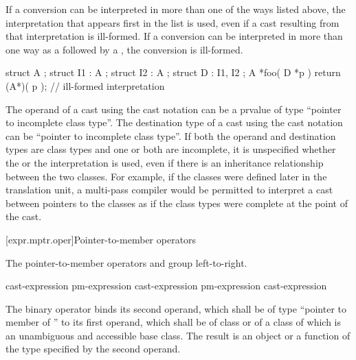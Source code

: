 If a conversion can be interpreted in more than one of the ways listed
above, the interpretation that appears first in the list is used, even
if a cast resulting from that interpretation is ill-formed. If a
conversion can be interpreted in more than one way as a
 followed by a , the conversion is
ill-formed.
\enterexample 

\begin{codeblock}
struct A { };
struct I1 : A { };
struct I2 : A { };
struct D : I1, I2 { };
A *foo( D *p ) {
  return (A*)( p ); // ill-formed  interpretation
}
\end{codeblock}
\exitexample 

\pnum
{}%
The operand of a cast using the cast notation can be a prvalue of type
``pointer to incomplete class type''. The destination type of a cast
using the cast notation can be ``pointer to incomplete class type''. If
both the operand and destination types are class types and one or both
are incomplete, it is unspecified whether the  or the
 interpretation is used, even if there is an
inheritance relationship between the two classes.
\enternote
For example, if the classes were defined later in the translation unit,
a multi-pass compiler would be permitted to interpret a cast between
pointers to the classes as if the class types were complete at the point
of the cast.
\exitnote%

[expr.mptr.oper]{Pointer-to-member operators}

\pnum
{}%
%
%
%
%
%
The pointer-to-member operators \tcode{->*} and  group
left-to-right.

\begin{bnf}
\br
    cast-expression\br
    pm-expression  cast-expression\br
    pm-expression \terminal{->*} cast-expression
\end{bnf}

\pnum
The binary operator  binds its second operand, which shall be
of type ``pointer to member of '' to its first operand, which shall be of
class  or of a class of which  is an unambiguous and
accessible base class. The result is an object or a function of the type
specified by the second operand.

